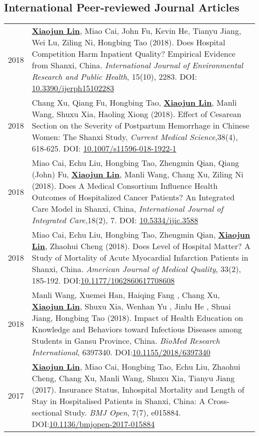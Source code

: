\documentclass[a4paper,10pt]{article}
\begin{document}
\subsection*{International Peer-reviewed Journal Articles}
\begin{longtable}{r p{13cm}}
2018 & \underline{\textbf{Xiaojun Lin}}, Miao Cai, John Fu, Kevin He, Tianyu Jiang, Wei Lu, Ziling Ni, Hongbing Tao (2018). Does Hospital Competition Harm Inpatient Quality? Empirical Evidence from Shanxi, China. \emph{ International Journal of Environmental Research and Public Health}, 15(10), 2283. DOI: \href{https://doi.org/10.3390/ijerph15102283}{10.3390/ijerph15102283}\\
2018 & Chang Xu, Qiang Fu, Hongbing Tao, \underline{\textbf{Xiaojun Lin}}, Manli Wang, Shuxu Xia, Haoling Xiong (2018). Effect of Cesarean Section on the Severity of Postpartum Hemorrhage in Chinese Women: The Shanxi Study, \emph{ Current Medical Science},38(4), 618-625. DOI: \href{https://doi.org/10.1007/s11596-018-1922-1}{10.1007/s11596-018-1922-1}\\
2018 & Miao Cai, Echu Liu, Hongbing Tao, Zhengmin Qian, Qiang (John) Fu, \underline{\textbf{Xiaojun Lin}}, Manli Wang, Chang Xu, Ziling Ni (2018). Does A Medical Consortium Influence Health Outcomes of Hospitalized Cancer Patients? An Integrated Care Model in Shanxi, China, \emph{ International Journal of Integrated Care},18(2), 7. DOI: \href{https://doi.org/10.5334/ijic.3588}{10.5334/ijic.3588}\\ 
2018 & Miao Cai, Echu Liu, Hongbing Tao, Zhengmin Qian, \underline{\textbf{Xiaojun Lin}}, Zhaohui Cheng (2018). Does Level of Hospital Matter? A Study of Mortality of Acute Myocardial Infarction Patients in Shanxi, China. \emph{ American Journal of Medical Quality}, 33(2), 185-192. DOI:\href{https://doi.org/10.1177/1062860617708608}{10.1177/1062860617708608}\\ 
2018 & Manli Wang, Xuemei Han, Haiqing Fang , Chang Xu, \underline{\textbf{Xiaojun Lin}}, Shuxu Xia, Wenhan Yu , Jinlu He , Shuai Jiang, Hongbing Tao (2018). Impact of Health Education on Knowledge and Behaviors toward Infectious Diseases among Students in Gansu Province, China. \emph{BioMed Research International}, 6397340. DOI:\href{https://doi.org/10.1155/2018/6397340}{10.1155/2018/6397340} \\
2017 &  \underline{\textbf{Xiaojun Lin}}, Miao Cai, Hongbing Tao, Echu Liu, Zhaohui Cheng, Chang Xu, Manli Wang, Shuxu Xia, Tianyu Jiang (2017). Insurance Status, Inhospital Mortality and Length of Stay in Hospitalised Patients in Shanxi, China: A Cross-sectional Study. \emph{ BMJ Open}, 7(7), e015884. DOI:\href{https://doi.org/10.1136/bmjopen-2017-015884}{10.1136/bmjopen-2017-015884}\\

\end{longtable}
\end{document}
